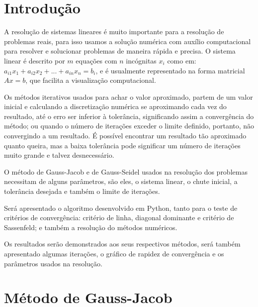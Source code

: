 \documentclass[
12pt,				%
openright,			%
twoside,			%
a4paper,			%
english,			%
french,				%
spanish,			%
brazil				%
]{abntex2_new}
\begin{document}
		\tableofcontents*
		
		
		\textual
		
		
		\chapter*[Introdução]{Introdução}
		A resolução de sistemas lineares é muito importante para a resolução de
		problemas
		reais, para isso usamos a solução numérica com auxílio computacional para
		resolver
		e solucionar problemas de maneira rápida e precisa. O sistema linear é descrito
		por 
		$m$ equações com $n$ incógnitas $x_i$ como em: $a_{i1} x_1 + a_{i2} x_2 + ... +
		a_{in} x_n = b_i$, 
		e é usualmente representado na forma matricial $Ax = b$, que facilita a
		visualização
		computacional.
		
		Os métodos iterativos usados para achar o valor aproximado, partem de um valor
		inicial
		e calculando a discretização numérica se aproximando cada vez do resultado, até
		o erro ser inferior à
		tolerância, significando assim a convergência do método; ou quando o número de iterações
		exceder o limite definido, portanto, não convergindo a um resultado. É possível encontrar
		 um resultado
		tão aproximado quanto
		queira, mas a baixa tolerância pode significar um número de iterações muito
		grande e talvez desnecessário.
		
		O método de Gauss-Jacob e de Gauss-Seidel usados na resolução dos problemas necessitam de alguns
		parâmetros, são eles, 
		o sistema linear, o chute inicial, a tolerância desejada e também o
		limite de iterações.
		
		Será apresentado o algoritmo desenvolvido em Python, tanto para o teste de
		critérios de convergência: 
		critério de linha, diagonal dominante e critério de Sassenfeld; e também a
		resolução do métodos numéricos.
		
		Os resultados serão demonstrados aos seus respectivos métodos, será também apresentado
		algumas iterações,
		o gráfico de rapidez de convergência e os parâmetros usados na resolução.
		
		\chapter{Método de Gauss-Jacob}
		
\end{document}
